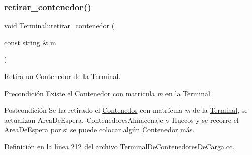\subsubsection{\texorpdfstring{retirar\+\_\+contenedor()}{retirar\_contenedor()}}
{\footnotesize\ttfamily void Terminal\+::retirar\+\_\+contenedor (\begin{DoxyParamCaption}\item[{const string \&}]{m }\end{DoxyParamCaption})}



Retira un \hyperlink{class_contenedor}{Contenedor} de la \hyperlink{class_terminal}{Terminal}. 

\begin{DoxyPrecond}{Precondición}
Existe el \hyperlink{class_contenedor}{Contenedor} con matrícula {\itshape m} en la \hyperlink{class_terminal}{Terminal} 
\end{DoxyPrecond}
\begin{DoxyPostcond}{Postcondición}
Se ha retirado el \hyperlink{class_contenedor}{Contenedor} con matrícula {\itshape m} de la \hyperlink{class_terminal}{Terminal}, se actualizan Area\+De\+Espera, Contenedores\+Almacenaje y Huecos y se recorre el Area\+De\+Espera por si se puede colocar algún \hyperlink{class_contenedor}{Contenedor} más. 
\end{DoxyPostcond}


Definición en la línea 212 del archivo Terminal\+De\+Contenedores\+De\+Carga.\+cc.



